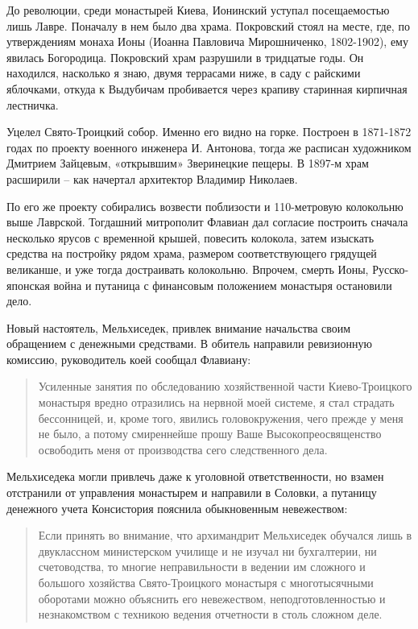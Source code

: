 До революции, среди монастырей Киева, Ионинский уступал посещаемостью лишь Лавре. Поначалу в нем было два храма. Покровский стоял на месте, где, по утверждениям монаха Ионы (Иоанна Павловича Мирошниченко, 1802-1902), ему явилась Богородица. Покровский храм разрушили в тридцатые годы. Он находился, насколько я знаю, двумя террасами ниже, в саду с райскими яблочками, откуда к Выдубичам пробивается через крапиву старинная кирпичная лестничка.

Уцелел Свято-Троицкий собор. Именно его видно на горке. Построен в 1871-1872 годах по проекту военного инженера И. Антонова, тогда же расписан художником Дмитрием Зайцевым, «открывшим» Зверинецкие пещеры. В 1897-м храм расширили – как начертал архитектор Владимир Николаев.

По его же проекту собирались возвести поблизости и 110-метровую колокольню выше Лаврской. Тогдашний митрополит Флавиан дал согласие построить сначала несколько ярусов с временной крышей, повесить колокола, затем изыскать средства на постройку рядом храма, размером соответствующего грядущей великанше, и уже тогда достраивать колокольню. Впрочем, смерть Ионы, Русско-японская война и путаница с финансовым положением монастыря остановили дело.

Новый настоятель, Мельхиседек, привлек внимание начальства своим обращением с денежными средствами. В обитель направили ревизионную комиссию, руководитель коей сообщал Флавиану:

\begin{quotation}
Усиленные занятия по обследованию хозяйственной части Киево-Троицкого монастыря вредно отразились на нервной моей системе, я стал страдать бессонницей, и, кроме того, явились головокружения, чего прежде у меня не было, а потому смиреннейше прошу Ваше Высокопреосвященство освободить меня от производства сего следственного дела.
\end{quotation}

Мельхиседека могли привлечь даже к уголовной ответственности, но взамен отстранили от управления монастырем и направили в Соловки, а путаницу  денежного учета Консистория пояснила обыкновенным невежеством:

\begin{quotation}
Если принять во внимание, что архимандрит Мельхиседек обучался лишь в двуклассном министерском училище и не изучал ни бухгалтерии, ни счетоводства, то многие неправильности в ведении им сложного и большого хозяйства Свято-Троицкого монастыря с многотысячными оборотами можно объяснить его невежеством, неподготовленностью и незнакомством с техникою ведения отчетности в столь сложном деле.
\end{quotation}

